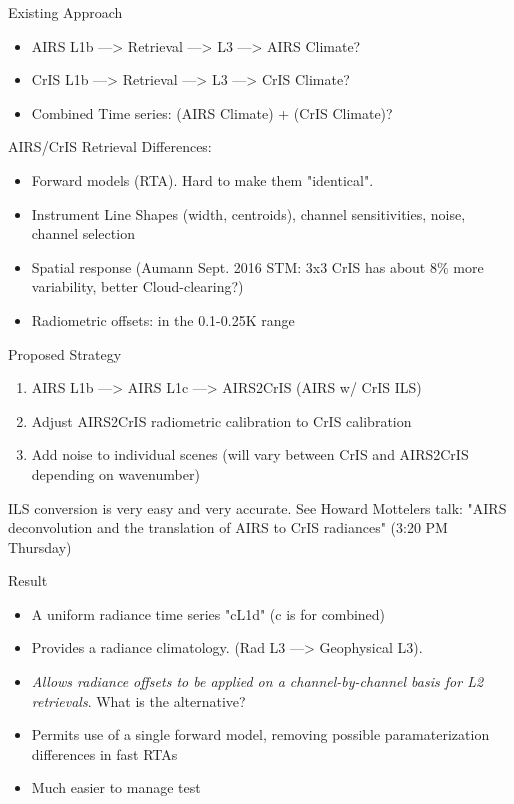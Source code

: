 \documentclass[10pt,t]{beamer}
\begin{document}
\begin{frame}[label={sec:orga95dadf}]{Existing Approach}
\begin{itemize}
\item AIRS L1b ---> Retrieval ---> L3 ---> AIRS Climate?
\item CrIS L1b ---> Retrieval ---> L3 ---> CrIS Climate?
\item Combined Time series: (AIRS Climate) + (CrIS Climate)?
\end{itemize}

\begin{block}{AIRS/CrIS Retrieval Differences:}
\begin{itemize}
\item Forward models (RTA).  Hard to make them "identical".
\item Instrument Line Shapes (width, centroids), channel sensitivities, noise, channel selection
\item Spatial response (Aumann Sept. 2016 STM: 3x3 CrIS has about 8\% more variability, better Cloud-clearing?)
\item Radiometric offsets: in the 0.1-0.25K range
\end{itemize}
\end{block}
\end{frame}

\begin{frame}[label={sec:org8c8ad53}]{Proposed Strategy}
\begin{enumerate}
\item AIRS L1b ---> AIRS L1c ---> AIRS2CrIS (AIRS w/ CrIS ILS)
\item Adjust AIRS2CrIS radiometric calibration to CrIS calibration
\item Add noise to individual scenes (will vary between CrIS and AIRS2CrIS depending on wavenumber)
\end{enumerate}
\footnotesize
ILS conversion is very easy and very accurate. See Howard Mottelers talk: "AIRS deconvolution and the translation of AIRS to CrIS radiances" (3:20 PM Thursday)

\normalsize
\begin{block}{Result}
\begin{itemize}
\item A uniform radiance time series "cL1d" (c is for combined)
\item Provides a radiance climatology.  (Rad L3 ---> Geophysical L3).
\item \emph{Allows radiance offsets to be applied on a channel-by-channel basis for L2 retrievals}.  What is the alternative?
\item Permits use of a single forward model, removing possible paramaterization differences in fast RTAs
\item Much easier to manage test
\end{itemize}
\end{block}
\end{frame}
\end{document}
